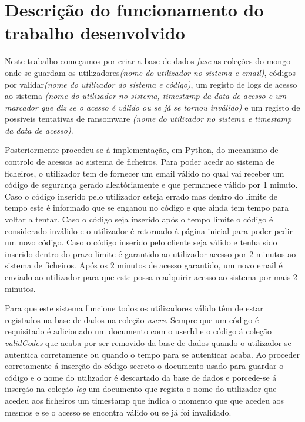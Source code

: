 
 
\section{Descrição do funcionamento do trabalho desenvolvido}

 \par Neste trabalho começamos por criar a base de dados \textit{fuse} as coleções do mongo onde se guardam os utilizadores\textit{(nome do utilizador no sistema e email)}, códigos por validar\textit{(nome do utilizador do sistema e código)}, um registo de logs de acesso ao sistema \textit{(nome do utilizador no sistema, timestamp da data de acesso e um marcador que diz se o acesso é válido ou se já se tornou inválido)} e um registo de possiveis tentativas de ransomware \textit{(nome do utilizador no sistema e timestamp da data de acesso)}.\newline
 \par Posteriormente procedeu-se á implementação, em Python, do mecanismo de controlo de acessos ao sistema de ficheiros. Para poder acedr ao sistema de ficheiros, o utilizador tem de fornecer um email válido no qual vai receber um código de segurança gerado aleatóriamente e que permanece válido por 1 minuto. Caso o código inserido pelo utilizador esteja errado mas dentro do limite de tempo este é informado que se enganou no código e que ainda tem tempo para voltar a tentar. Caso o código seja inserido após o tempo limite o código é considerado inválido e o utilizador é retornado á página inicial para poder pedir um novo código. Caso o código inserido pelo cliente seja válido e tenha sido inserido dentro do prazo limite é garantido ao utilizador acesso por 2 minutos ao sistema de ficheiros. Após os 2 minutos de acesso garantido, um novo email é enviado ao utilizador para que este possa readquirir acesso ao sistema por mais 2 minutos.\newline
 \par Para que este sistema funcione todos os utilizadores válido têm de estar registados na base de dados na coleção \textit{users}. Sempre que um código é requisitado é adicionado um documento com o userId e o código á coleção \textit{validCodes} que acaba por ser removido da base de dados quando o utilizador se autentica corretamente ou quando o tempo para se autenticar acaba. Ao proceder corretamente á inserção do código secreto o documento usado para guardar o código  e  o nome do utilizador é descartado da base de dados e porcede-se á inserção na coleção \textit{log} um documento que regista o nome do utilizador que acedeu aos ficheiros um timestamp que indica o momento que que acedeu aos mesmos e se o acesso se encontra válido ou se já foi invalidado.\newline
